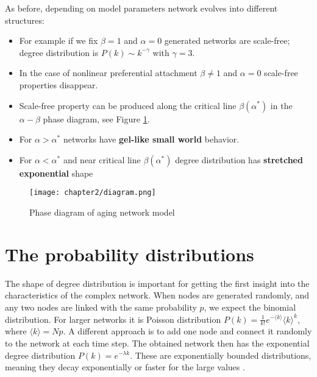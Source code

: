 As before, depending on model parameters network evolves into different structures:  
\begin{itemize}
	\item For example if we fix $\beta=1$ and $\alpha=0$ generated networks are scale-free; degree distribution is $P(k) \sim k^{-\gamma}$ with $\gamma=3$.
	\item In the case of nonlinear preferential attachment $\beta \neq 1$ and $\alpha=0$ scale-free properties disappear. 
	\item Scale-free property can be produced along the critical line $\beta(\alpha^{*})$ in the $\alpha-\beta$ phase diagram, see Figure \ref{fig:diagram}.
	
	\item For $\alpha>\alpha^{*}$ networks have \textbf{gel-like small world} behavior.
	
	\item For $\alpha<\alpha^{*}$ and near critical line $\beta(\alpha^{*})$ degree distribution has \textbf{stretched exponential} shape
	
\end{itemize}

\begin{figure}[h]
	\centering
	\texttt{[image: chapter2/diagram.png]}
	\caption[Phase diagram of aging network model]{Phase diagram of aging network model}
	\label{fig:diagram}
\end{figure}


\newpage

\section{The probability distributions}

The shape of degree distribution is important for getting the first insight into the characteristics of the complex network. When nodes are generated randomly, and any two nodes are linked with the same probability $p$,  we expect the binomial distribution. For larger networks it is Poisson distribution $P(k) = \frac{1}{k!}e^{-\langle k \rangle}\langle k \rangle^{k}$, where $\langle k \rangle = Np$. A different approach is to add one node and connect it randomly to the network at each time step. The obtained network then has the exponential degree distribution $P(k)=e^{-\lambda k}$. These are exponentially bounded distributions, meaning they decay exponentially or faster for the large values \cite{barabasi2016network}. 

